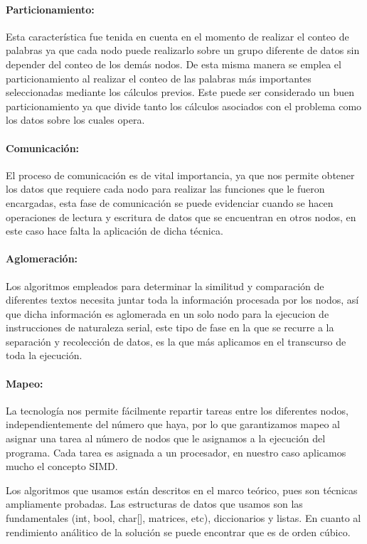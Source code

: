 \documentclass[fleqn,10pt]{SelfArx} %
\begin{document}
\paragraph{Particionamiento:}
Esta característica fue tenida en cuenta en el momento de realizar el conteo de palabras ya que cada nodo puede realizarlo sobre un grupo diferente de datos sin depender del conteo de los demás nodos. 
De esta misma manera se emplea el particionamiento al realizar el conteo de las palabras más importantes seleccionadas  mediante los cálculos previos.
Este puede ser considerado un buen particionamiento ya que divide tanto los cálculos asociados con el problema como los datos sobre los cuales opera.

\paragraph{Comunicación:}
El proceso de comunicación es de vital importancia, ya que nos permite obtener los datos que requiere cada nodo para realizar las funciones que le fueron encargadas, esta fase de comunicación se puede evidenciar cuando se hacen operaciones de lectura y escritura de datos que se encuentran en otros nodos, en este caso hace falta la aplicación de dicha técnica.


\paragraph{Aglomeración:}
Los algoritmos empleados para determinar la similitud y comparación de diferentes textos necesita juntar toda la información procesada por los nodos, así que dicha información es aglomerada en un solo nodo para la ejecucion de instrucciones de naturaleza serial, este tipo de fase en la que se recurre a la separación y recolección de datos, es la que más aplicamos en el transcurso de toda la ejecución.

\paragraph{Mapeo:}
La tecnología nos permite fácilmente repartir tareas entre los diferentes nodos, independientemente del número que haya, por lo que garantizamos mapeo al asignar una tarea al número de nodos que le asignamos a la ejecución del programa. Cada tarea es asignada a un procesador, en nuestro caso aplicamos mucho el concepto SIMD.

Los algoritmos que usamos están descritos en el marco teórico, pues son técnicas ampliamente probadas.
Las estructuras de datos que usamos son las fundamentales (int, bool, char[], matrices, etc), diccionarios y listas.
En cuanto al rendimiento análitico de la solución se puede encontrar que es de orden cúbico.
\end{document}

